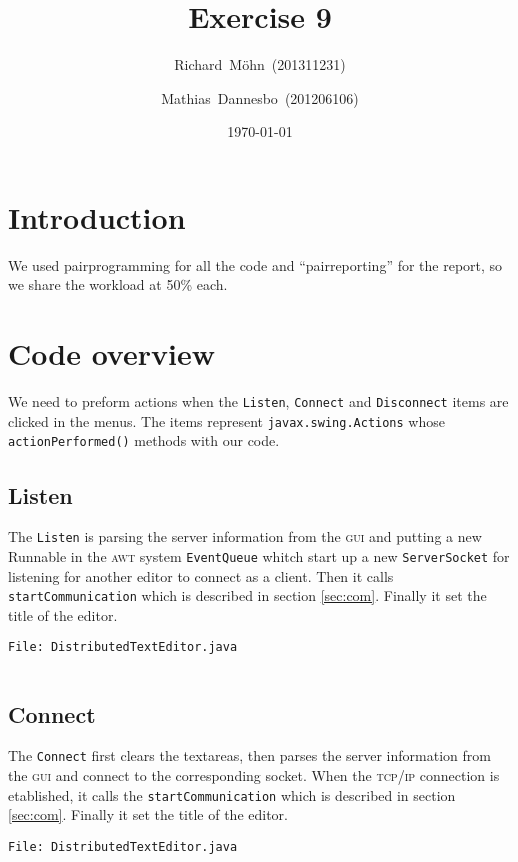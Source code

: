 \documentclass[a4paper,draft,12pt,oneside,article,table]{memoir}
\newcommand{\supertitle}[1]{\gdef\suP{#1}}
\newcommand{\subtitle}[1]{\gdef\suB{#1}}
\newcommand{\stunum}[1]{\gdef\stuN{#1}}
\newcommand{\srcpath}{../ex09/src/main/java/ddist}
\newcommand{\inmnt}[3]{\vspace{1em}\noindent\texttt{\color{gray}File: #3}\vspace{-1em}\inputminted[tabsize=4,firstline=#1,firstnumber=#1,lastline=#2,linenos]{java}{\srcpath/#3}}
\newcommand{\mil}[1]{\texttt{#1}}
\begin{document}
\supertitle{Distributed Systems}
\title{Exercise 9}
\author{Richard~Möhn~\small{(201311231)} \and Mathias~Dannesbo~\small{(201206106)}}
\date{\today}
\maketitle

\chapter{Introduction}
We used pairprogramming for all the code and ``pairreporting'' for the
report, so we share the workload at 50\% each.

\chapter{Code overview}
We need to preform actions when the \mil{Listen}, \mil{Connect} and
\mil{Disconnect} items are clicked in the menus. The items represent
\mil{javax.swing.Actions} whose \mil{actionPerformed()} methods with
our code.

\section{Listen}

The \mil{Listen} is parsing the server information from the
\textsc{gui} and putting a new Runnable in the \textsc{awt} system
\mil{EventQueue} whitch start up a new \mil{ServerSocket} for
listening for another editor to connect as a client. Then it calls
\mil{startCommunication} which is described in section
\ref{sec:com}. Finally it set the title of the editor.

\inmnt{139}{193}{DistributedTextEditor.java}

\section{Connect}
The \mil{Connect} first clears the textareas, then parses the server
information from the \textsc{gui} and connect to the corresponding
socket. When the \textsc{tcp/ip} connection is etablished, it calls
the \mil{startCommunication} which is described in section
\ref{sec:com}. Finally it set the title of the editor.

\inmnt{195}{228}{DistributedTextEditor.java}
\end{document}
